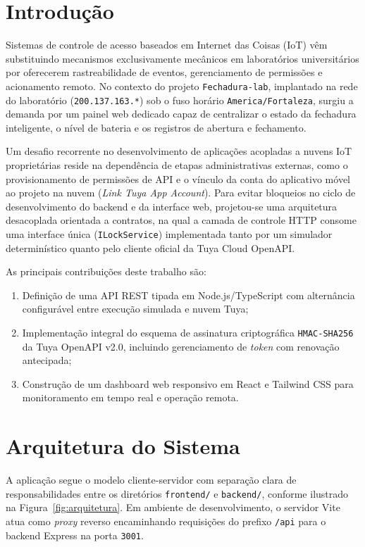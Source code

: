 \documentclass[10pt,twocolumn,a4paper]{article}
\begin{document}
\section{Introdu\c{c}\~ao}

Sistemas de controle de acesso baseados em Internet das Coisas (IoT) v\^em substituindo mecanismos exclusivamente mec\^anicos em laborat\'orios universit\'arios por oferecerem rastreabilidade de eventos, gerenciamento de permiss\~oes e acionamento remoto. No contexto do projeto \texttt{Fechadura-lab}, implantado na rede do laborat\'orio (\texttt{200.137.163.*}) sob o fuso hor\'ario \texttt{America/Fortaleza}, surgiu a demanda por um painel web dedicado capaz de centralizar o estado da fechadura inteligente, o n\'ivel de bateria e os registros de abertura e fechamento.

Um desafio recorrente no desenvolvimento de aplica\c{c}\~oes acopladas a nuvens IoT propriet\'arias reside na depend\^encia de etapas administrativas externas, como o provisionamento de permiss\~oes de API e o v\'inculo da conta do aplicativo m\'ovel ao projeto na nuvem (\textit{Link Tuya App Account}). Para evitar bloqueios no ciclo de desenvolvimento do backend e da interface web, projetou-se uma arquitetura desacoplada orientada a contratos, na qual a camada de controle HTTP consome uma interface \'unica (\texttt{ILockService}) implementada tanto por um simulador determin\'istico quanto pelo cliente oficial da Tuya Cloud OpenAPI.

As principais contribui\c{c}\~oes deste trabalho s\~ao:
\begin{enumerate}
  \item Defini\c{c}\~ao de uma API REST tipada em Node.js/TypeScript com altern\^ancia configur\'avel entre execu\c{c}\~ao simulada e nuvem Tuya;
  \item Implementa\c{c}\~ao integral do esquema de assinatura criptogr\'afica \texttt{HMAC-SHA256} da Tuya OpenAPI v2.0, incluindo gerenciamento de \textit{token} com renova\c{c}\~ao antecipada;
  \item Constru\c{c}\~ao de um dashboard web responsivo em React e Tailwind CSS para monitoramento em tempo real e opera\c{c}\~ao remota.
\end{enumerate}

\section{Arquitetura do Sistema}

A aplica\c{c}\~ao segue o modelo cliente-servidor com separa\c{c}\~ao clara de responsabilidades entre os diret\'orios \texttt{frontend/} e \texttt{backend/}, conforme ilustrado na Figura~\ref{fig:arquitetura}. Em ambiente de desenvolvimento, o servidor Vite atua como \textit{proxy} reverso encaminhando requisi\c{c}\~oes do prefixo \texttt{/api} para o backend Express na porta \texttt{3001}.
\end{document}
